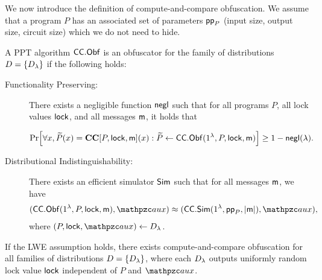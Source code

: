 We now introduce the definition of compute-and-compare obfuscation.
We assume that a program $P$ has an associated set of parameters $\mathsf{pp}_P$ (input size, output size, circuit size) which we do not need to hide.
\begin{definition}\label{def:CCObf}
A PPT algorithm $\mathsf{CC}.\mathsf{Obf}$ is an obfuscator for the family of distributions $D=\{D_\lambda\}$ if the following holds:
\begin{description}
\item[Functionality Preserving:] There exists a negligible function
${\mathsf{negl}}$ such that for all programs $P$, all lock values $\mathsf{lock}$, and
all messages $\mathsf{m}$, it holds that

\begin{align}
\Pr[\forall x, \widetilde{P}(x)=\mathbf{CC}[P,\mathsf{lock},\mathsf{m}](x) :
\widetilde{P}\leftarrow\mathsf{CC}.\mathsf{Obf}(1^\lambda,P,\mathsf{lock},\mathsf{m})] \ge 1-{\mathsf{negl}}(\lambda).
\end{align}
\item[Distributional Indistinguishability:] There exists an
efficient simulator $\mathsf{Sim}$ such that for all messages $\mathsf{m}$, we have
\begin{align}
(\CCObf(1^\secp,P,\lock,\msg),\qaux)\approx(\CCSim(1^\secp,\pp_P,\abs{\msg}),\qaux),
\end{align}
where $(P,\lock,\qaux)\la D_\secp$.
\end{description}
\end{definition}

\begin{theorem}
If the LWE assumption holds, there exists compute-and-compare obfuscation for all families of distributions $D=\{D_\lambda\}$, where each $D_\lambda$ outputs uniformly random lock value $\mathsf{lock}$ independent of $P$ and $\qaux$.
\end{theorem}
